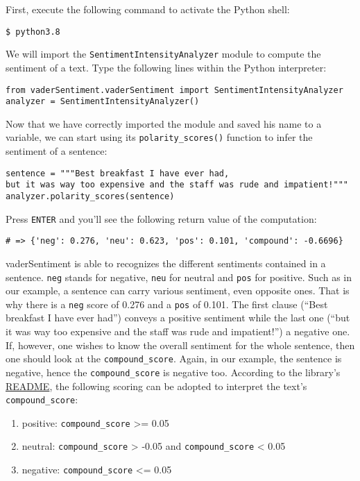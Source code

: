 	First, execute the following command to activate the Python shell:
	\begin{Verbatim}
$ python3.8
	\end{Verbatim}
	We will import the \verb|SentimentIntensityAnalyzer| module to compute the sentiment of a text. Type the following lines within the Python interpreter:
	\begin{Verbatim}
from vaderSentiment.vaderSentiment import SentimentIntensityAnalyzer
analyzer = SentimentIntensityAnalyzer()
	\end{Verbatim}
Now that we have correctly imported the module and saved his name to a variable, we can start using its \verb|polarity_scores()| function to infer the sentiment of a sentence:
	\begin{Verbatim}
sentence = """Best breakfast I have ever had,
but it was way too expensive and the staff was rude and impatient!"""
analyzer.polarity_scores(sentence)
	\end{Verbatim}
	Press \verb|ENTER| and you'll see the following return value of the computation:
\begin{Verbatim}
# => {'neg': 0.276, 'neu': 0.623, 'pos': 0.101, 'compound': -0.6696}
\end{Verbatim}
	vaderSentiment is able to recognizes the different sentiments contained in a sentence. \verb|neg| stands for negative, \verb|neu| for neutral and \verb|pos| for positive. Such as in our example, a sentence can carry various sentiment, even opposite ones. That is why there is a \verb|neg| score of 0.276 and a \verb|pos| of 0.101. The first clause (``Best breakfast I have ever had'') conveys a positive sentiment while the last one (``but it was way too expensive and the staff was rude and impatient!'') a negative one. If, however, one wishes to know the overall sentiment for the whole sentence, then one should look at the \verb|compound_score|. Again, in our example, the sentence is negative, hence the \verb|compound_score| is negative too. According to the library's \href{https://github.com/cjhutto/vaderSentiment#about-the-scoring}{README}, the following scoring can be adopted to interpret the text's \verb|compound_score|:

	\begin{enumerate}
		\item [] positive: \verb|compound_score| >= 0.05
		\item [] neutral: \verb|compound_score| > -0.05 and \verb|compound_score| < 0.05
		\item [] negative: \verb|compound_score| <= 0.05
	\end{enumerate}

